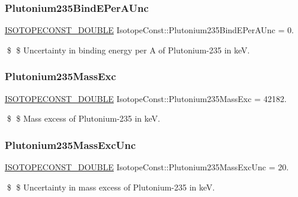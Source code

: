 \subsubsection{\texorpdfstring{Plutonium235\+Bind\+E\+Per\+A\+Unc}{Plutonium235BindEPerAUnc}}
{\footnotesize\ttfamily \mbox{\hyperlink{group___isotope_const-_macros_ga8f45a7272ce02c0b4c65c44636ed719a}{I\+S\+O\+T\+O\+P\+E\+C\+O\+N\+S\+T\+\_\+\+D\+O\+U\+B\+LE}} Isotope\+Const\+::\+Plutonium235\+Bind\+E\+Per\+A\+Unc = 0.}

\$ \$ Uncertainty in binding energy per A of Plutonium-\/235 in keV. \mbox{\label{group___isotope_const-_plutonium-_pu235_gabb72e1e32ad81f37329641d693ee5850}} 
\subsubsection{\texorpdfstring{Plutonium235\+Mass\+Exc}{Plutonium235MassExc}}
{\footnotesize\ttfamily \mbox{\hyperlink{group___isotope_const-_macros_ga8f45a7272ce02c0b4c65c44636ed719a}{I\+S\+O\+T\+O\+P\+E\+C\+O\+N\+S\+T\+\_\+\+D\+O\+U\+B\+LE}} Isotope\+Const\+::\+Plutonium235\+Mass\+Exc = 42182.}

\$ \$ Mass excess of Plutonium-\/235 in keV. \mbox{\label{group___isotope_const-_plutonium-_pu235_ga813cc4d0fa89969c7653ffa03b35e672}} 
\subsubsection{\texorpdfstring{Plutonium235\+Mass\+Exc\+Unc}{Plutonium235MassExcUnc}}
{\footnotesize\ttfamily \mbox{\hyperlink{group___isotope_const-_macros_ga8f45a7272ce02c0b4c65c44636ed719a}{I\+S\+O\+T\+O\+P\+E\+C\+O\+N\+S\+T\+\_\+\+D\+O\+U\+B\+LE}} Isotope\+Const\+::\+Plutonium235\+Mass\+Exc\+Unc = 20.}

\$ \$ Uncertainty in mass excess of Plutonium-\/235 in keV. \mbox{\label{group___isotope_const-_plutonium-_pu235_gae4e6bfe1ca36432f4cb016df2db8203f}} 
